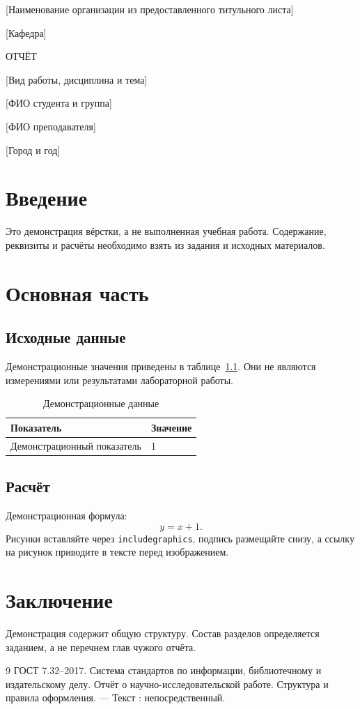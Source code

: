 \documentclass[a4paper,14pt,times]{G7-32}
\begin{document}
\begin{GuapTitle}
\centering
{[Наименование организации из предоставленного титульного листа]}\par
{[Кафедра]}\par
\vfill
ОТЧЁТ\par
{[Вид работы, дисциплина и тема]}\par
\vfill
{[ФИО студента и группа]}\par
{[ФИО преподавателя]}\par
\vfill
{[Город и год]}\par
\end{GuapTitle}
\frontmatter
\tableofcontents
\chapter*{Введение}
Это демонстрация вёрстки, а не выполненная учебная работа. Содержание,
реквизиты и расчёты необходимо взять из задания и исходных материалов.
\mainmatter
\chapter{Основная часть}
\section{Исходные данные}
Демонстрационные значения приведены в таблице~\ref{tab:demo}.
Они не являются измерениями или результатами лабораторной работы.
\begin{table}[htbp]
\caption{Демонстрационные данные}\label{tab:demo}
\centering
\begin{tabular}{|p{90mm}|p{40mm}|}
\hline
Показатель & Значение \\
\hline
Демонстрационный показатель & 1 \\
\hline
\end{tabular}
\end{table}
\section{Расчёт}
Демонстрационная формула:
\begin{equation}
y = x + 1.
\end{equation}
Рисунки вставляйте через \texttt{includegraphics}, подпись размещайте снизу,
а ссылку на рисунок приводите в тексте перед изображением.
\backmatter
\chapter*{Заключение}
Демонстрация содержит общую структуру. Состав разделов определяется заданием,
а не перечнем глав чужого отчёта.
\begin{thebibliography}{9}
 ГОСТ 7.32–2017. Система стандартов по информации,
библиотечному и издательскому делу. Отчёт о научно-исследовательской работе.
Структура и правила оформления. — Текст : непосредственный.
\end{thebibliography}
\end{document}
